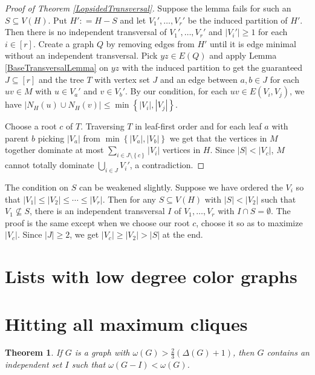 \documentclass[openany]{tufte-book} %
\theoremstyle{plain}
\newtheorem{theorem}{Theorem}
\newcommand{\set}[1]{\left\{ #1 \right\}}
\newcommand{\card}[1]{\left|#1\right|}
\newcommand{\irange}[1]{\left[#1\right]}
\newcommand{\DefinedAs}{\mathrel{\mathop:}=}
\begin{document}
\begin{proof}[Proof of Theorem \ref{LopsidedTransversal}]
Suppose the lemma fails for such an $S \subseteq V(H)$.  Put $H' \DefinedAs H - S$ and let $V_1', \ldots, V_r'$ be the induced partition of $H'$. Then there is no independent transversal of $V_1', \ldots, V_r'$ and $\card{V_i'} \geq 1$ for each $i \in \irange{r}$. Create a graph $Q$ by removing edges from $H'$ until it is edge minimal without an independent transversal. Pick $yz \in E(Q)$ and apply Lemma 
\ref{BaseTransversalLemma} on $yz$ with the induced partition to get the guaranteed 
$J \subseteq \irange{r}$ and the tree $T$ with vertex set $J$ and an edge between $a, b \in
J$ for each $uv \in M$ with $u \in V_a'$ and $v \in V_b'$.  By our condition, for each $uv \in E(V_i, V_j)$, we have $\card{N_H(u) \cup N_H(v)} \leq \min\set{\card{V_i}, \card{V_j}}$.

Choose a root $c$ of $T$. Traversing $T$ in leaf-first order and for each leaf $a$ with parent $b$ picking $|V_a|$ from $\min\set{|V_a|, |V_b|}$ we get that the vertices in $M$ together dominate at most $\sum_{i \in J \setminus \set{c}} \card{V_i}$ vertices in $H$.  Since $\card{S} < \card{V_c}$, $M$ cannot totally dominate $\bigcup_{i \in J} V_i'$, a contradiction.
\end{proof}

The condition on $S$ can be weakened slightly.  Suppose we have ordered the $V_i$ so that $\card{V_1} \leq \card{V_2} \leq \cdots \leq \card{V_r}$.  Then for any $S \subseteq V(H)$ with $\card{S} < \card{V_2}$ such that $V_1 \not \subseteq S$, there is an independent transversal $I$ of $V_1, \ldots, V_r$ with $I \cap S = \emptyset$.  The proof is the same except when we choose our root $c$, choose it so as to maximize $\card{V_c}$.  
Since $\card{J} \geq 2$, we get $\card{V_c} \geq \card{V_2} > \card{S}$ at the end.
\section{Lists with low degree color graphs}

\section{Hitting all maximum cliques}
\begin{theorem}\label{KingHittingSet}
If $G$ is a graph with $\omega(G) > \frac23 (\Delta(G) + 1)$, then $G$ contains
an independent set $I$ such that $\omega(G - I) < \omega(G)$.
\end{theorem}
\end{document}
